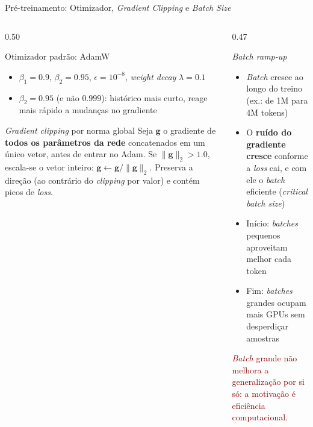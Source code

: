 \documentclass[aspectratio=169, xcolor=dvipsnames]{beamer}
\begin{document}
  \begin{frame}{Pré-treinamento: Otimizador, \textit{Gradient Clipping} e \textit{Batch Size}}
    \small
    \begin{columns}[T]
      \begin{column}{0.50\textwidth}
        \begin{block}{Otimizador padrão: AdamW}
          \begin{itemize}
            \item $\beta_1{=}0.9$, $\beta_2{=}0.95$, $\epsilon{=}10^{-8}$, \textit{weight decay} $\lambda{=}0.1$
            \item $\beta_2{=}0.95$ (e não $0.999$): histórico mais curto, reage mais rápido a mudanças no gradiente
          \end{itemize}
        \end{block}
        \begin{block}{\textit{Gradient clipping} por norma global}
          Seja $\mathbf{g}$ o gradiente de \textbf{todos os parâmetros da rede} concatenados em um único vetor, antes de entrar no Adam.
          Se $\|\mathbf{g}\|_2 > 1.0$, escala-se o vetor inteiro: $\mathbf{g} \leftarrow \mathbf{g}/\|\mathbf{g}\|_2$.
          Preserva a direção (ao contrário do \textit{clipping} por valor) e contém picos de \textit{loss}.
        \end{block}
      \end{column}
      \begin{column}{0.47\textwidth}
        \begin{block}{\textit{Batch ramp-up} \cite{mccandlish2018batch}}
          \begin{itemize}
            \item \textit{Batch} cresce ao longo do treino (ex.: de 1M para 4M tokens)
            \item O \textbf{ruído do gradiente cresce} conforme a \textit{loss} cai, e com ele o \textit{batch} eficiente (\textit{critical batch size})
            \item Início: \textit{batches} pequenos aproveitam melhor cada token
            \item Fim: \textit{batches} grandes ocupam mais GPUs sem desperdiçar amostras
          \end{itemize}
        \end{block}
        \textcolor{DarkRed}{\textit{Batch} grande não melhora a generalização por si só: a motivação é eficiência computacional.}
      \end{column}

\end{columns}
\end{frame}
\end{document}
